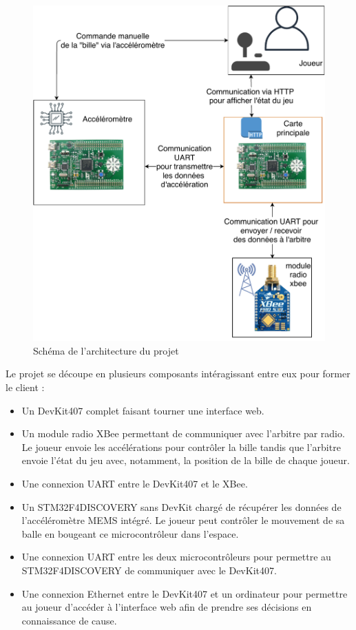 \documentclass[12pt,french]{article}
\begin{document}
\begin{figure}[H] 
\centering
\includegraphics[width=\textwidth]{smoc_diagram.pdf}
\caption{Schéma de l'architecture du projet}
\label{fig:diagram}
\end{figure}

Le projet se découpe en plusieurs composants intéragissant entre eux pour former le client :

\begin{itemize}
    \item Un DevKit407 complet faisant tourner une interface web.
    \item Un module radio XBee permettant de communiquer avec l'arbitre par radio. Le joueur envoie les accélérations pour contrôler la bille tandis que l'arbitre envoie l'état du jeu avec, notamment, la position de la bille de chaque joueur.
    \item Une connexion UART entre le DevKit407 et le XBee.
    \item Un STM32F4DISCOVERY sans DevKit chargé de récupérer les données de l'accéléromètre MEMS intégré. Le joueur peut contrôler le mouvement de sa balle en bougeant ce microcontrôleur dans l'espace.
    \item Une connexion UART entre les deux microcontrôleurs pour permettre au STM32F4DISCOVERY de communiquer avec le DevKit407.
    \item Une connexion Ethernet entre le DevKit407 et un ordinateur pour permettre au joueur d'accéder à l'interface web afin de prendre ses décisions en connaissance de cause.
\end{itemize}
\end{document}
